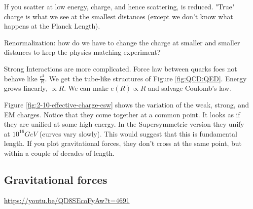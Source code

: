 \documentclass[]{article}
\begin{document}
If you scatter at low energy, charge, and hence scattering, is reduced. "True" charge is what we see at the smallest distances (except we don't know what happens at the Planck Length).

Renormalization: how do we have to change the charge at smaller and smaller distances to keep the physics matching experiment?

Strong Interactions are more complicated. Force law between quarks foes not behave like $\frac{e^2}{R}$. We get the tube-like structures of Figure \ref{fig:QCD:QED}. Energy grows linearly, $\propto R$. We can make $e(R) \propto R$ and salvage Coulomb's law.

Figure \ref{fig:2-10-effective-charge-esw} shows the variation of the weak, strong, and EM charges. Notice that they come together at a common point. It looks as if they are unified at some high energy. In the Supersymmetric version they unify at $10^{16}GeV$ (curves vary slowly). This would suggest that this is fundamental length. If you plot gravitational forces, they don't cross at the same point, but within a couple of decades of length.

\subsection{Gravitational forces}


\url{https://youtu.be/QD8SEcoFyAw?t=4691}
\end{document}
